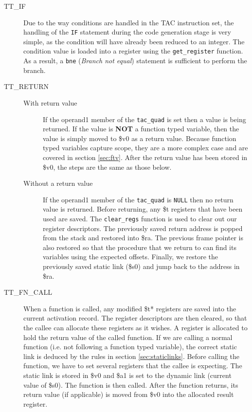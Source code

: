 \begin{description}
	\item[TT\_IF] Due to the way conditions are handled in the TAC instruction set, the handling of the \verb!IF! statement during the code generation stage is very simple, as the condition will have already been reduced to an integer. The condition value is loaded into a register using the \verb!get_register! function. As a result, a \verb!bne! (\emph{Branch not equal}) statement is sufficient to perform the branch.
	\item[TT\_RETURN]
		\begin{description}
			\item[With return value] If the operand1 member of the \verb!tac_quad! is set then a value is being returned. If the value is \textbf{NOT} a function typed variable, then the value is simply moved to \$v0 as a return value. Because function typed variables capture scope, they are a more complex case and are covered in section \ref{sec:ftv}. After the return value has been stored in \$v0, the steps are the same as those below.
			\item[Without a return value] If the operand1 member of the \verb!tac_quad! is \verb!NULL! then no return value is returned. Before returning, any \$t registers that have been used are saved. The \verb!clear_regs! function is used to clear out our register descriptors. The previously saved return address is popped from the stack and restored into \$ra. The previous frame pointer is also restored so that the procedure that we return to can find its variables using the expected offsets. Finally, we restore the previously saved static link (\$s0) and jump back to the address in \$ra.
		\end{description}
	\item[TT\_FN\_CALL] When a function is called, any modified \$t* registers are saved into the current activation record. The register descriptors are then cleared, so that the callee can allocate these registers as it wishes. A register is allocated to hold the return value of the called function. If we are calling a normal function (i.e. not following a function typed variable), the correct static link is deduced by the rules in section \ref{sec:staticlinks}. Before calling the function, we have to set several registers that the callee is expecting. The static link is stored in \$v0 and \$a1 is set to the dynamic link (current value of \$s0). The function is then called. After the function returns, its return value (if applicable) is moved from \$v0 into the allocated result register.
	\ \\ \ \\

\end{description}
